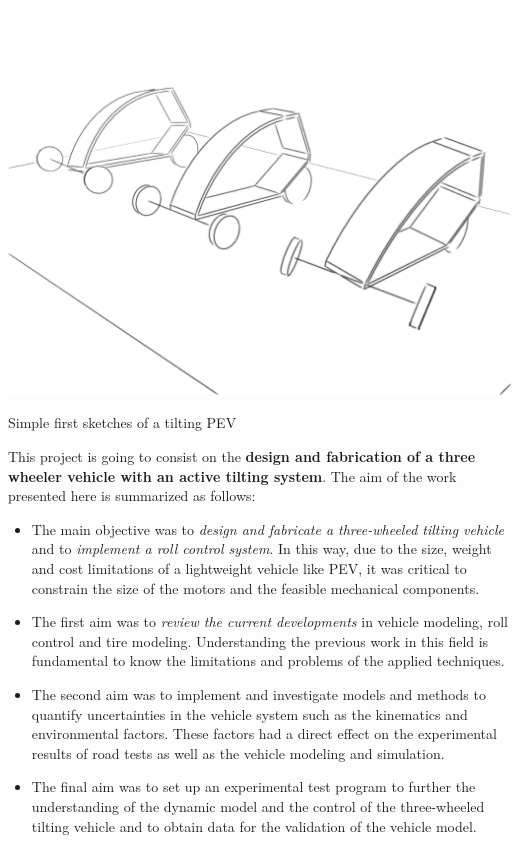 \begin{marginfigure}
	\includegraphics[width=1.3\linewidth]{figs/01/tilting_sketch}
	\caption{Simple first sketches of a tilting PEV}
\end{marginfigure}

This project is going to consist on the \textbf{design and fabrication of a three wheeler vehicle with an active tilting system}. The aim of the work presented here is summarized as follows:

\begin{itemize}\itemsep -8pt
	\begin{itemize}
	\item  The main objective was to \textit{design and fabricate a three-wheeled tilting vehicle} and to \textit{implement a roll control system}. In this way, due to the size, weight and cost limitations of a lightweight vehicle like PEV, it was critical to constrain the size of the motors and the feasible mechanical components.
	
	\item The first aim was to \textit{review the current developments} in vehicle modeling, roll control and tire modeling. Understanding the previous work in this field is fundamental to know the limitations and problems of the applied techniques. 
	
	\item The second aim was to implement and investigate models and methods to quantify uncertainties in the vehicle system such as the kinematics and environmental factors. These factors had a direct effect on the experimental results of road tests as well as the vehicle modeling and simulation. 
	
	\item The final aim was to set up an experimental test program to further the understanding of the dynamic model and the control of the three-wheeled tilting vehicle and to obtain data for the validation of the vehicle model.
	\end{itemize}
\end{itemize}

